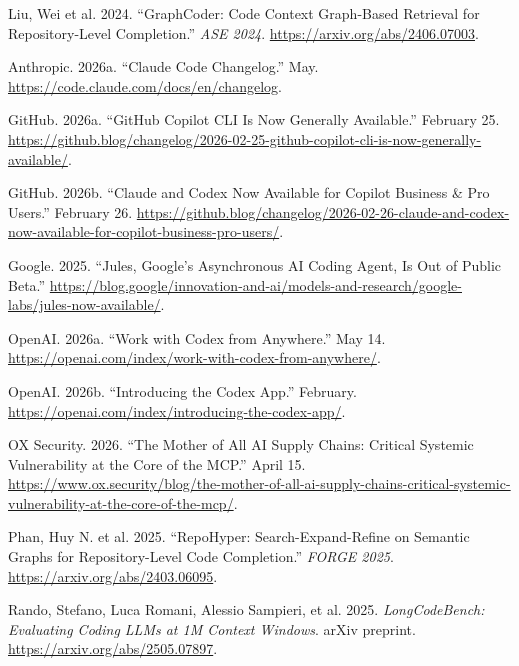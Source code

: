 \documentclass[
  11pt,
  letterpaper,
  numbers=noendperiod,
  parskip=half]{scrartcl}
\newlength{\cslhangindent}
\newenvironment{CSLReferences}[2] %
 {\begin{list}{}{%
  \setlength{\itemindent}{0pt}
  \setlength{\leftmargin}{0pt}
  \setlength{\parsep}{0pt}
  \ifodd #1
   \setlength{\leftmargin}{\cslhangindent}
   \setlength{\itemindent}{-1\cslhangindent}
  \fi
  \setlength{\itemsep}{#2\baselineskip}}}
 {\end{list}}
\begin{document}
\begin{CSLReferences}{1}{1}
{Liu, Wei et al.} 2024. {``{GraphCoder}: Code Context Graph-Based
Retrieval for Repository-Level Completion.''} \emph{ASE 2024}.
\url{https://arxiv.org/abs/2406.07003}.

Anthropic. 2026a. {``{Claude Code} Changelog.''} May.
\url{https://code.claude.com/docs/en/changelog}.

GitHub. 2026a. {``{GitHub Copilot CLI} Is Now Generally Available.''}
February 25.
\url{https://github.blog/changelog/2026-02-25-github-copilot-cli-is-now-generally-available/}.

GitHub. 2026b. {``Claude and Codex Now Available for {Copilot Business}
\& {Pro} Users.''} February 26.
\url{https://github.blog/changelog/2026-02-26-claude-and-codex-now-available-for-copilot-business-pro-users/}.

Google. 2025. {``Jules, Google's Asynchronous {AI} Coding Agent, Is Out
of Public Beta.''}
\url{https://blog.google/innovation-and-ai/models-and-research/google-labs/jules-now-available/}.

OpenAI. 2026a. {``Work with {Codex} from Anywhere.''} May 14.
\url{https://openai.com/index/work-with-codex-from-anywhere/}.

OpenAI. 2026b. {``Introducing the {Codex} App.''} February.
\url{https://openai.com/index/introducing-the-codex-app/}.

OX Security. 2026. {``The Mother of All {AI} Supply Chains: Critical
Systemic Vulnerability at the Core of the {MCP}.''} April 15.
\url{https://www.ox.security/blog/the-mother-of-all-ai-supply-chains-critical-systemic-vulnerability-at-the-core-of-the-mcp/}.

{Phan, Huy N. et al.} 2025. {``{RepoHyper}: Search-Expand-Refine on
Semantic Graphs for Repository-Level Code Completion.''} \emph{FORGE
2025}. \url{https://arxiv.org/abs/2403.06095}.

Rando, Stefano, Luca Romani, Alessio Sampieri, et al. 2025.
\emph{{LongCodeBench}: Evaluating Coding LLMs at 1M Context Windows}.
arXiv preprint. \url{https://arxiv.org/abs/2505.07897}.


\end{CSLReferences}
\end{document}
